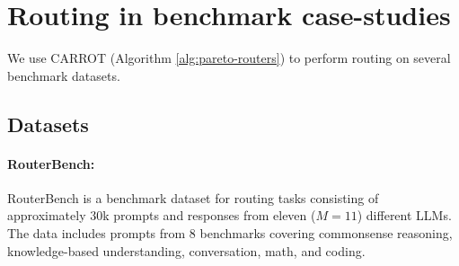 \section{Routing in benchmark case-studies}
\label{sec:routing-application}
We use CARROT (Algorithm \ref{alg:pareto-routers}) to perform routing on several benchmark datasets. %


\subsection{Datasets} \label{sec:datasets}




\paragraph{RouterBench:} RouterBench \citep{hu2024routerbench} is a benchmark dataset for routing tasks consisting of approximately 30k prompts and responses from eleven ($M = 11$) different LLMs.  The data includes prompts from 8 benchmarks covering commonsense reasoning, knowledge-based understanding, conversation, math, and coding. %
